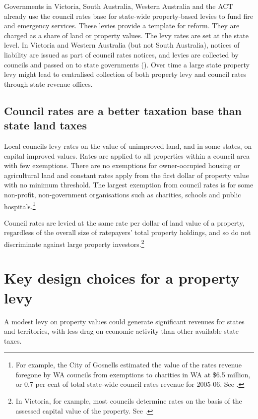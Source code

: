Governments in Victoria, South Australia, Western Australia and the ACT already use the council rates base for state-wide property-based levies to fund fire and emergency services. These levies provide a template for reform. They are charged as a share of land or property values. The levy rates are set at the state level. In Victoria and Western Australia (but not South Australia), notices of liability are issued as part of council rates notices, and levies are collected by councils and passed on to state governments (). Over time a large state property levy might lead to centralised collection of both property levy and council rates through state revenue offices.

\section{\label{sec:PROP-5-2}Council rates are a better taxation base than state land taxes}
Local councils levy rates on the value of unimproved land, and in some states, on capital improved values. Rates are applied to all properties within a council area with few exemptions. There are no exemptions for owner-occupied housing or agricultural land and constant rates apply from the first dollar of property value with no minimum threshold. The largest exemption from council rates is for some non-profit, non-government organisations such as charities, schools and public hospitals.\footnote{For example, the City of Gosnells estimated the value of the rates revenue foregone by WA councils from exemptions to charities in WA at \$6.5 million, or 0.7 per cent of total state-wide council rates revenue for 2005-06. See \textcite[][107]{productivity2008assessing}.}

Council rates are levied at the same rate per dollar of land value of a property, regardless of the overall size of ratepayers’ total property holdings, and so do not discriminate against large property investors.\footnote{In Victoria, for example, most councils determine rates on the basis of the assessed capital value of the property. See \textcite[][154]{HefferanBoyd2010}.}  

\chapter{Key design choices for a property levy}
A modest levy on property values could generate significant revenues for states and territories, with less drag on economic activity than other available state taxes.

